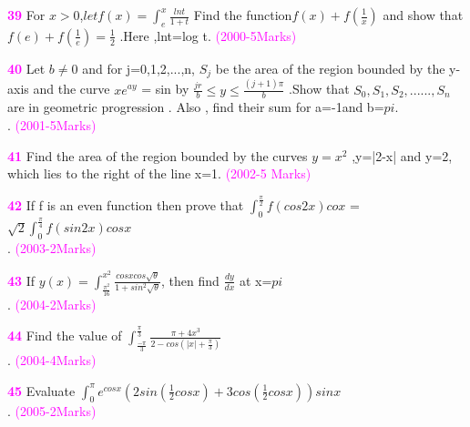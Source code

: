 \documentclass[journal,12pt,twocolumn]{IEEEtran}
\theoremstyle{remark}
\begin{document}
														    \textbf{\textcolor{magenta}{39}}
														    For $x > 0 $,$
														    let f(x)=\int_{e}^{x}\frac{lnt}{1+t}$
														    Find the function$ f(x) + f(\frac{1}{x})$
														    and show that $f(e)+f(\frac{1}{e})=
														    \frac{1}{2}$ .Here ,lnt=log t.
														      \hfill{\textcolor{magenta}{(2000-5Marks)}}
														        

															  \textbf{\textcolor{magenta}{40}}
															    Let $b\neq0$ and for j=0,1,2,...,n, $S_j$ be the area of the region bounded by the y-axis and the curve $xe^{ay}$ = sin by $\frac{jr}{b} \le y \le \frac{(j+1)\pi}{b}$ .Show that  $S_0,S_1,S_2,......,S_n$ are in geometric progression . Also , find their sum for a=-1and b=$pi$.\\.
															      \hfill{\textcolor{magenta}{(2001-5Marks)}}
															        
																  \textbf{\textcolor{magenta}{41}}
																    Find the area of the region bounded by the curves $y=x^2$ ,y=|2-x| and y=2, which lies to the right of the line x=1.
																      \hfill{\textcolor{magenta}{(2002-5 Marks) }}

																        \textbf{\textcolor{magenta}{42}}
																	  If f is an even function then prove that 
																	    $\int_{0}^{\frac{\pi}{2}}f(cos2x)cox $ =$\sqrt{2}\int_{0}^{\frac{\pi}{4}}f(sin2x)cosx$\\.
																	      \hfill{\textcolor{magenta}{(2003-2Marks)}}
																	        
																		   \textbf{\textcolor{magenta}{43}}
																		      If $y(x)=\int_{\frac{\pi^2}{16}}^{x^2}\frac{cosxcos\sqrt{\theta}}{1+sin^2\sqrt{\theta}}$, then find $\frac{dy}{dx}$ at x=$pi$\\.
																		         \hfill{\textcolor{magenta}{(2004-2Marks)}}

																			    \textbf{\textcolor{magenta}{44}}
																			       Find the value of $\int_{\frac{-\pi}{3}}^{\frac{\pi}{3}}\frac{\pi+4x^3}{2-cos(|x|+\frac{\pi}{3})}$\\.
																			          \hfill{\textcolor{magenta}{(2004-4Marks)}}

																				     \textbf{\textcolor{magenta}{45}}
																				        Evaluate $\int_{0}^{\pi}e^{cosx}(2sin(\frac{1}{2}cosx)+3cos(\frac{1}{2}cosx))sinx$\\.
																					   \hfill{\textcolor{magenta}{(2005-2Marks)}}
\end{document}
